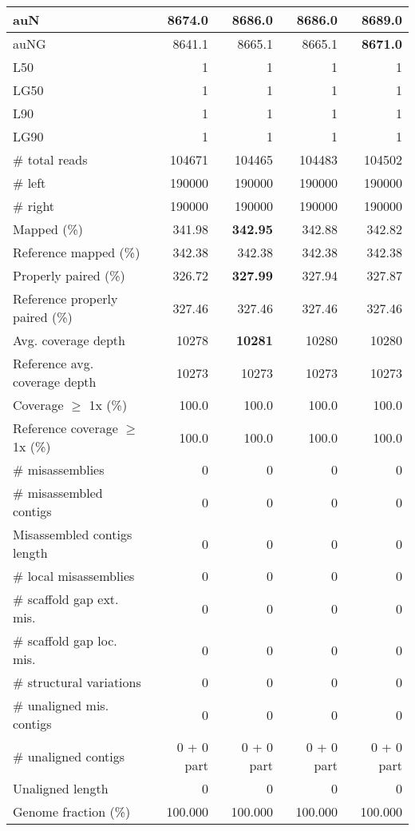 \documentclass[12pt,a4paper]{article}
\begin{document}
\begin{table}[ht]
\begin{center}
\begin{tabular}{|l*{4}{|r}|}
auN & 8674.0 & 8686.0 & 8686.0 & {\bf 8689.0} \\ \hline
auNG & 8641.1 & 8665.1 & 8665.1 & {\bf 8671.0} \\ \hline
L50 & 1 & 1 & 1 & 1 \\ \hline
LG50 & 1 & 1 & 1 & 1 \\ \hline
L90 & 1 & 1 & 1 & 1 \\ \hline
LG90 & 1 & 1 & 1 & 1 \\ \hline
\# total reads & 104671 & 104465 & 104483 & 104502 \\ \hline
\# left & 190000 & 190000 & 190000 & 190000 \\ \hline
\# right & 190000 & 190000 & 190000 & 190000 \\ \hline
Mapped (\%) & 341.98 & {\bf 342.95} & 342.88 & 342.82 \\ \hline
Reference mapped (\%) & 342.38 & 342.38 & 342.38 & 342.38 \\ \hline
Properly paired (\%) & 326.72 & {\bf 327.99} & 327.94 & 327.87 \\ \hline
Reference properly paired (\%) & 327.46 & 327.46 & 327.46 & 327.46 \\ \hline
Avg. coverage depth & 10278 & {\bf 10281} & 10280 & 10280 \\ \hline
Reference avg. coverage depth & 10273 & 10273 & 10273 & 10273 \\ \hline
Coverage $\geq$ 1x (\%) & 100.0 & 100.0 & 100.0 & 100.0 \\ \hline
Reference coverage $\geq$ 1x (\%) & 100.0 & 100.0 & 100.0 & 100.0 \\ \hline
\# misassemblies & 0 & 0 & 0 & 0 \\ \hline
\# misassembled contigs & 0 & 0 & 0 & 0 \\ \hline
Misassembled contigs length & 0 & 0 & 0 & 0 \\ \hline
\# local misassemblies & 0 & 0 & 0 & 0 \\ \hline
\# scaffold gap ext. mis. & 0 & 0 & 0 & 0 \\ \hline
\# scaffold gap loc. mis. & 0 & 0 & 0 & 0 \\ \hline
\# structural variations & 0 & 0 & 0 & 0 \\ \hline
\# unaligned mis. contigs & 0 & 0 & 0 & 0 \\ \hline
\# unaligned contigs & 0 + 0 part & 0 + 0 part & 0 + 0 part & 0 + 0 part \\ \hline
Unaligned length & 0 & 0 & 0 & 0 \\ \hline
Genome fraction (\%) & 100.000 & 100.000 & 100.000 & 100.000 \\ \hline

\end{tabular}
\end{center}
\end{table}
\end{document}
